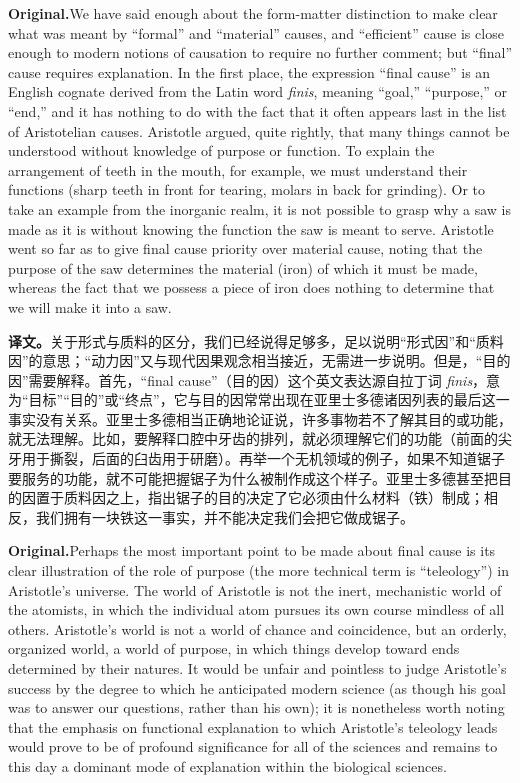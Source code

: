 \documentclass[UTF8]{ctexart}
\newcommand{\orig}{\par\noindent\textbf{Original.}\quad}
\newcommand{\zh}{\par\noindent\textbf{译文。}\quad}
\begin{document}
\orig We have said enough about the form-matter distinction to make clear what was meant by ``formal'' and ``material'' causes, and ``efficient'' cause is close enough to modern notions of causation to require no further comment; but ``final'' cause requires explanation. In the first place, the expression ``final cause'' is an English cognate derived from the Latin word \textit{finis}, meaning ``goal,'' ``purpose,'' or ``end,'' and it has nothing to do with the fact that it often appears last in the list of Aristotelian causes. Aristotle argued, quite rightly, that many things cannot be understood without knowledge of purpose or function. To explain the arrangement of teeth in the mouth, for example, we must understand their functions (sharp teeth in front for tearing, molars in back for grinding). Or to take an example from the inorganic realm, it is not possible to grasp why a saw is made as it is without knowing the function the saw is meant to serve. Aristotle went so far as to give final cause priority over material cause, noting that the purpose of the saw determines the material (iron) of which it must be made, whereas the fact that we possess a piece of iron does nothing to determine that we will make it into a saw.

\zh 关于形式与质料的区分，我们已经说得足够多，足以说明“形式因”和“质料因”的意思；“动力因”又与现代因果观念相当接近，无需进一步说明。但是，“目的因”需要解释。首先，“final cause”（目的因）这个英文表达源自拉丁词 \textit{finis}，意为“目标”“目的”或“终点”，它与目的因常常出现在亚里士多德诸因列表的最后这一事实没有关系。亚里士多德相当正确地论证说，许多事物若不了解其目的或功能，就无法理解。比如，要解释口腔中牙齿的排列，就必须理解它们的功能（前面的尖牙用于撕裂，后面的臼齿用于研磨）。再举一个无机领域的例子，如果不知道锯子要服务的功能，就不可能把握锯子为什么被制作成这个样子。亚里士多德甚至把目的因置于质料因之上，指出锯子的目的决定了它必须由什么材料（铁）制成；相反，我们拥有一块铁这一事实，并不能决定我们会把它做成锯子。

\orig Perhaps the most important point to be made about final cause is its clear illustration of the role of purpose (the more technical term is ``teleology'') in Aristotle's universe. The world of Aristotle is not the inert, mechanistic world of the atomists, in which the individual atom pursues its own course mindless of all others. Aristotle's world is not a world of chance and coincidence, but an orderly, organized world, a world of purpose, in which things develop toward ends determined by their natures. It would be unfair and pointless to judge Aristotle's success by the degree to which he anticipated modern science (as though his goal was to answer our questions, rather than his own); it is nonetheless worth noting that the emphasis on functional explanation to which Aristotle's teleology leads would prove to be of profound significance for all of the sciences and remains to this day a dominant mode of explanation within the biological sciences.
\end{document}

